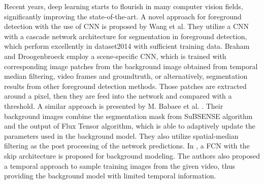 \documentclass[journal]{IEEEtran}
\begin{document}
%
Recent years, deep learning starts to flourish in many computer vision fields, significantly improving the state-of-the-art. A novel approach for foreground detection with the use of CNN is proposed by Wang et al.
They utilize a CNN with a cascade network architecture for segmentation in foreground detection, which perform excellently in dataset2014 with sufficient training data.
%
Braham and Droogenbroeck\cite{Braham2016deep} employ a scene-specific CNN, which is trained with corresponding image patches from the background image obtained from temporal median filtering, video frames and groundtruth, or alternatively, segmentation results from other foreground detection methods. Those patches are extracted around a pixel, then they are feed into the network and compared with a threshold.
A similar approach is presented by M. Babaee et al. \cite{Babaee2017deep}. Their background images combine the segmentation mask from SuBSENSE\cite{St-Charles2015SuBSENSE} algorithm and the output of Flux Tensor algorithm, which is able to adaptively update the parameters used in the background model. They also utilize spatial-median filtering as the post processing of the network predictions.
In \cite{Yang2018DBMF}, a FCN with the skip architecture is proposed for background modeling. 
The authors also proposed a temporal approach to sample training images from the given video, thus providing the background model with limited temporal information. 
\end{document}
